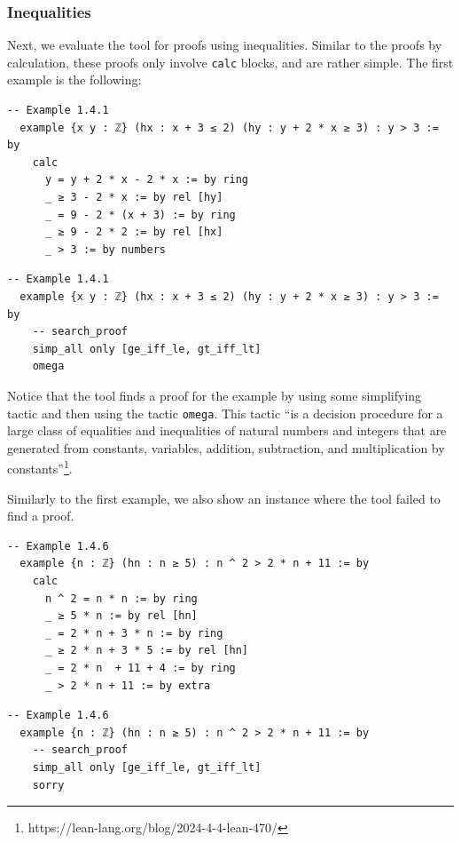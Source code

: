\documentclass[12pt]{article}
\newcommand{\leancopilot}{\texttt{LeanCopilot} }
\begin{document}
\subsubsection{Inequalities}
Next, we evaluate the tool for proofs using inequalities. Similar to the proofs by calculation, these proofs only involve \texttt{calc} blocks, and are rather simple. The first example is the following:

\begin{minipage}{0.495\textwidth}
  \begin{lstlisting}[title={Human proof}]
  -- Example 1.4.1
  example {x y : ℤ} (hx : x + 3 ≤ 2) (hy : y + 2 * x ≥ 3) : y > 3 := by
    calc
      y = y + 2 * x - 2 * x := by ring
      _ ≥ 3 - 2 * x := by rel [hy]
      _ = 9 - 2 * (x + 3) := by ring
      _ ≥ 9 - 2 * 2 := by rel [hx]
      _ > 3 := by numbers
  \end{lstlisting}
\end{minipage}
\vline
\begin{minipage}{0.495\textwidth}
  \begin{lstlisting}[title={\leancopilot proof}]
  -- Example 1.4.1
  example {x y : ℤ} (hx : x + 3 ≤ 2) (hy : y + 2 * x ≥ 3) : y > 3 := by
    -- search_proof  
    simp_all only [ge_iff_le, gt_iff_lt]
    omega
  \end{lstlisting}
\end{minipage}

Notice that the tool finds a proof for the example by using some simplifying tactic and then using the tactic \texttt{omega}. This tactic ``is a decision procedure for a large class of equalities and inequalities of natural numbers and integers that are generated from constants, variables, addition, subtraction, and multiplication by constants''\footnote{https://lean-lang.org/blog/2024-4-4-lean-470/}.

Similarly to the first example, we also show an instance where the tool failed to find a proof.

\begin{minipage}{0.495\textwidth}
  \begin{lstlisting}[title={Human proof}]
  -- Example 1.4.6
  example {n : ℤ} (hn : n ≥ 5) : n ^ 2 > 2 * n + 11 := by
    calc
      n ^ 2 = n * n := by ring
      _ ≥ 5 * n := by rel [hn]
      _ = 2 * n + 3 * n := by ring
      _ ≥ 2 * n + 3 * 5 := by rel [hn]
      _ = 2 * n  + 11 + 4 := by ring
      _ > 2 * n + 11 := by extra
  \end{lstlisting}
\end{minipage}
\vline
\begin{minipage}{0.495\textwidth}
  \begin{lstlisting}[title={\leancopilot proof}]
  -- Example 1.4.6
  example {n : ℤ} (hn : n ≥ 5) : n ^ 2 > 2 * n + 11 := by
    -- search_proof
    simp_all only [ge_iff_le, gt_iff_lt]
    sorry
  \end{lstlisting}
\end{minipage}
\end{document}
